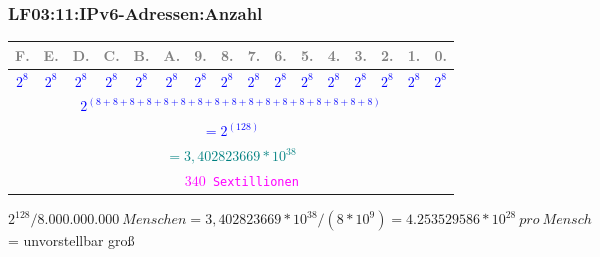 \begin{frame}[fragile]  
  \frametitle{LF03:11:IPv6-Adressen:Anzahl}

  \vspace{0.2cm}
  \begin{tiny}
    
  \begin{center}
    \renewcommand{\arraystretch}{3}
    \begin{tabular}{|c|c|c|c|c|c|c|c|c|c|c|c|c|c|c|c|}
      \hline
      \textcolor{gray}{\tiny{F.}} & \textcolor{gray}{\tiny{E.}} &
        \textcolor{gray}{\tiny{D.}} & \textcolor{gray}{\tiny{C.}} &
          \textcolor{gray}{\tiny{B.}} & \textcolor{gray}{\tiny{A.}} &
            \textcolor{gray}{\tiny{9.}} & \textcolor{gray}{\tiny{8.}} &
              \textcolor{gray}{\tiny{7.}} & \textcolor{gray}{\tiny{6.}} &
                \textcolor{gray}{\tiny{5.}} & \textcolor{gray}{\tiny{4.}} &
                  \textcolor{gray}{\tiny{3.}} & \textcolor{gray}{\tiny{2.}} &
                   \textcolor{gray}{\tiny{1.}} & \textcolor{gray}{\tiny{0.}} \\
      \hline
      \textcolor{blue}{\tiny{$2^8$}} & \textcolor{blue}{\tiny{$2^8$}} &
        \textcolor{blue}{\tiny{$2^8$}} & \textcolor{blue}{\tiny{$2^8$}} &
          \textcolor{blue}{\tiny{$2^8$}} & \textcolor{blue}{\tiny{$2^8$}} &
            \textcolor{blue}{\tiny{$2^8$}} & \textcolor{blue}{\tiny{$2^8$}} &
              \textcolor{blue}{\tiny{$2^8$}} & \textcolor{blue}{\tiny{$2^8$}} &
                \textcolor{blue}{\tiny{$2^8$}} & \textcolor{blue}{\tiny{$2^8$}} &
                  \textcolor{blue}{\tiny{$2^8$}} & \textcolor{blue}{\tiny{$2^8$}} &
                   \textcolor{blue}{\tiny{$2^8$}} & \textcolor{blue}{\tiny{$2^8$}} \\
      \hline
      \multicolumn{16}{|c|}{\footnotesize{\textcolor{blue}{
        \texttt{$2^{(8 + 8 + 8 + 8 + 8 + 8 + 8 + 8 + 8 + 8 + 8 + 8 + 8 + 8 + 8 + 8 + 8)}$}}}} \\
    \hline
    \multicolumn{16}{|c|}{\small{\textcolor{blue}{\texttt{$= 2^{(128)}$}}}} \\
    \hline
    \multicolumn{16}{|c|}{\normalsize{\textcolor{teal}{\texttt{$= 3,402823669*10^{38}$}}}} \\
    \hline
    \multicolumn{16}{|c|}{\normalsize{\textcolor{magenta}{\texttt{ ~ $340$ Sextillionen}}}} \\
    \hline
  \end{tabular}
\end{center}
\end{tiny}

\vspace{0.4cm}
\begin{flushright}
\begin{tiny}
$2^{128} / 8.000.000.000\ Menschen = 3,402823669*10^{38} / (8*10^{9})  = 4.253529586*10^{28}\ pro\ Mensch$ = unvorstellbar groß
\end{tiny}
\end{flushright}

\end{frame}


